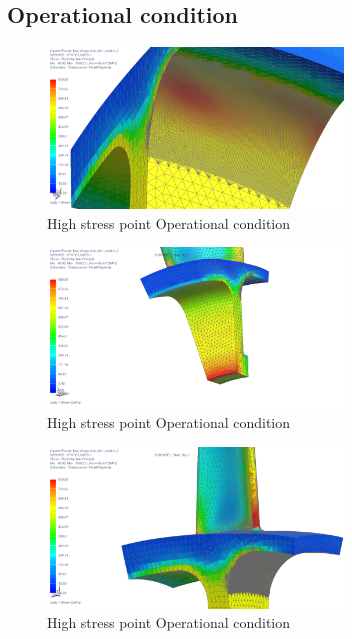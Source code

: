 \subsection{Operational condition}

\begin{figure}[H]
\centering
\includegraphics[width=0.7\textwidth]{Figures/Redisgn_Op_Edgeblend.png}
\caption{High stress point Operational condition }
\label{fig:highstressoperational1}
\end{figure}

\begin{figure}[H]
\centering
\includegraphics[width=0.7\textwidth]{Figures/Redisng_Op_Edge.png}
\caption{High stress point Operational condition }
\label{fig:highstressoperational3}
\end{figure}

\begin{figure}[H]
\centering
\includegraphics[width=0.7\textwidth]{Figures/Redesign_Op_Blade.png}
\caption{High stress point Operational condition }
\label{fig:highstressoperational2}
\end{figure}

